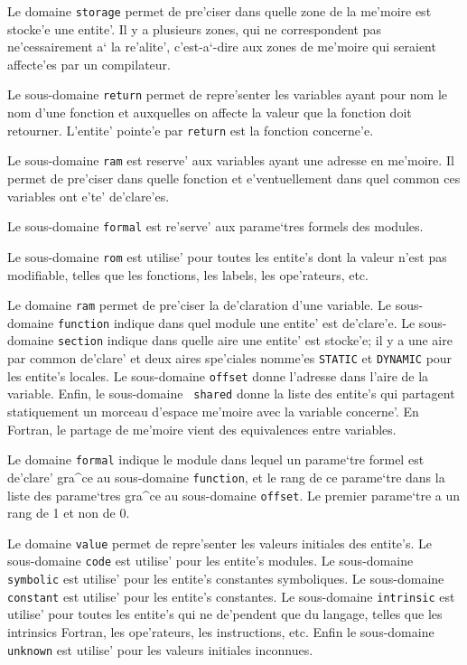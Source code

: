 {
Le domaine \verb/storage/ permet de pre'ciser dans quelle zone de la
me'moire est stocke'e une entite'. Il y a plusieurs zones, qui ne
correspondent pas ne'cessairement a` la re'alite', c'est-a`-dire aux
zones de me'moire qui seraient affecte'es par un compilateur.

Le sous-domaine \verb/return/ permet de repre'senter les variables ayant
pour nom le nom d'une fonction et auxquelles on affecte la valeur que la
fonction doit retourner. L'entite' pointe'e par \verb/return/ est la
fonction concerne'e.

Le sous-domaine \verb/ram/ est reserve' aux variables ayant une adresse
en me'moire. Il permet de pre'ciser dans quelle fonction et
e'ventuellement dans quel common ces variables ont e'te' de'clare'es.

Le sous-domaine \verb/formal/ est re'serve' aux parame`tres formels des
modules.

Le sous-domaine \verb/rom/ est utilise' pour toutes les entite's dont la
valeur n'est pas modifiable, telles que les fonctions, les labels, les
ope'rateurs, etc.
}

{
Le domaine \verb/ram/ permet de pre'ciser la de'claration d'une
variable. Le sous-domaine \verb/function/ indique dans quel module une
entite' est de'clare'e. Le sous-domaine \verb/section/ indique dans
quelle aire une entite' est stocke'e; il y a une aire par common
de'clare' et deux aires spe'ciales nomme'es \verb/STATIC/ et
\verb/DYNAMIC/ pour les entite's locales. Le sous-domaine \verb/offset/
donne l'adresse dans l'aire de la variable. Enfin, le sous-domaine {\tt
shared} donne la liste des entite's qui partagent statiquement un
morceau d'espace me'moire avec la variable concerne'. En Fortran, le
partage de me'moire vient des equivalences entre variables.  }

{
Le domaine \verb/formal/ indique le module dans lequel un parame`tre formel
est de'clare' gra^ce au sous-domaine \verb/function/, et le rang de ce
parame`tre dans la liste des parame`tres gra^ce au sous-domaine
\verb/offset/.
Le premier parame`tre a un rang de 1 et non de 0.
}

{
Le domaine \verb/value/ permet de repre'senter les
valeurs initiales des entite's. Le sous-domaine \verb/code/ est utilise'
pour les entite's modules. Le sous-domaine \verb/symbolic/ est utilise'
pour les entite's constantes symboliques. Le sous-domaine
\verb/constant/ est utilise' pour les entite's constantes. Le
sous-domaine \verb/intrinsic/ est utilise' pour toutes les entite's qui
ne de'pendent que du langage, telles que les intrinsics Fortran, les
ope'rateurs, les instructions, etc. Enfin le sous-domaine
\verb/unknown/ est utilise' pour les valeurs initiales inconnues.
}

